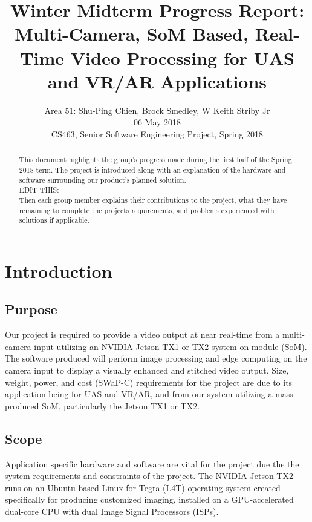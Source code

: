 \documentclass[letterpaper,10pt,serif,draftclsnofoot,onecolumn,compsoc,titlepage]{IEEEtran}
\title{Winter Midterm Progress Report: Multi-Camera, SoM Based, Real-Time Video Processing for UAS and VR/AR Applications}
\author{Area 51: Shu-Ping Chien, Brock Smedley, W Keith Striby Jr \\ 06 May 2018 \\ CS463, Senior Software Engineering Project, Spring 2018}
\begin{document}
\begin{titlepage}
\maketitle

\begin{abstract}

This document highlights the group's progress made during the first half of the 
Spring 2018 term. The project is introduced along with an explanation of the 
hardware and software surrounding our product's planned solution. \\

EDIT THIS:\\
Then each group member
explains their contributions to the project, what they have remaining to complete
the projects requirements, and problems experienced with solutions if applicable. \\


\thispagestyle{empty}
\end{abstract}
\end{titlepage}

\newpage
\tableofcontents

\newpage

\section{Introduction}

\subsection{Purpose}
Our project is required to provide a video output at near real-time from a 
multi-camera input utilizing an NVIDIA Jetson TX1 or TX2 system-on-module (SoM). 
The software produced will perform image processing and edge computing on the 
camera input to display a visually enhanced and stitched video output. 
Size, weight, power, and cost (SWaP-C) requirements for the project are due 
to its application being for UAS and VR/AR, and from our system utilizing a 
mass-produced SoM, particularly the Jetson TX1 or TX2. \\

\subsection{Scope}

Application specific hardware and software are vital for the project due the the 
system requirements and constraints of the project.
The NVIDIA Jetson TX2 runs on an Ubuntu based Linux for Tegra (L4T) operating 
system created specifically for producing customized imaging, installed on a 
GPU-accelerated dual-core CPU with dual Image Signal Processors (ISPs). \\
\end{document}
